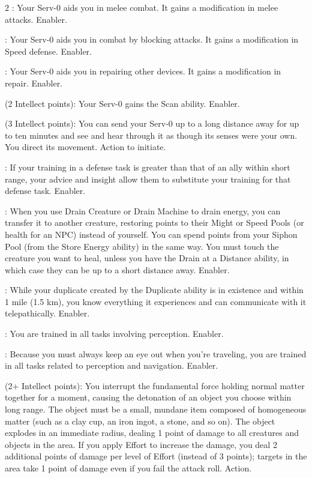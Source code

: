 \begin{multicols}{2}
: Your Serv-0 aids you in melee combat. It gains a modification in melee attacks. Enabler. 
 
: Your Serv-0 aids you in combat by blocking attacks. It gains a modification in Speed defense. Enabler. 
 
: Your Serv-0 aids you in repairing other devices. It gains a modification in repair. Enabler. 
 
 (2 Intellect points): Your Serv-0 gains the Scan ability. Enabler.
 
 (3 Intellect points): You can send your Serv-0 up to a long distance away for up to ten minutes and see and hear through it as though its senses were your own. You direct its movement. Action to initiate. 
 
: If your training in a defense task is greater than that of an ally within short range, your advice and insight allow them to substitute your training for that defense task. Enabler. 
 
: When you use Drain Creature or Drain Machine to drain energy, you can transfer it to another creature, restoring points to their Might or Speed Pools (or health for an NPC) instead of yourself. You can spend points from your Siphon Pool (from the Store Energy ability) in the same way. You must touch the creature you want to heal, unless you have the Drain at a Distance ability, in which case they can be up to a short distance away. Enabler. 
 
: While your duplicate created by the Duplicate ability is in existence and within 1 mile (1.5 km), you know everything it experiences and can communicate with it telepathically. Enabler. 
 
: You are trained in all tasks involving perception. Enabler. 
 
: Because you must always keep an eye out when you’re traveling, you are trained in all tasks related to perception and navigation. Enabler. 
 
 (2+ Intellect points): You interrupt the fundamental force holding normal matter together for a moment, causing the detonation of an object you choose within long range. The object must be a small, mundane item composed of homogeneous matter (such as a clay cup, an iron ingot, a stone, and so on). The object explodes in an immediate radius, dealing 1 point of damage to all creatures and objects in the area. If you apply Effort to increase the damage, you deal 2 additional points of damage per level of Effort (instead of 3 points); targets in the area take 1 point of damage even if you fail the attack roll. Action. 
 

\end{multicols}
